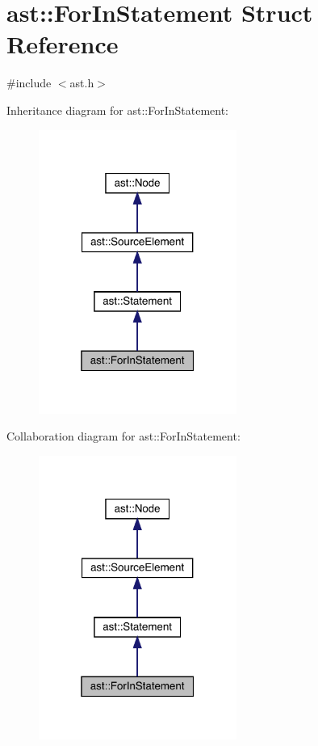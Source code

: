 \hypertarget{structast_1_1_for_in_statement}{}\section{ast\+:\+:For\+In\+Statement Struct Reference}
\label{structast_1_1_for_in_statement}


{\ttfamily \#include $<$ast.\+h$>$}



Inheritance diagram for ast\+:\+:For\+In\+Statement\+:
\nopagebreak
\begin{figure}[H]
\begin{center}
\leavevmode
\includegraphics[width=184pt]{structast_1_1_for_in_statement__inherit__graph}
\end{center}
\end{figure}


Collaboration diagram for ast\+:\+:For\+In\+Statement\+:
\nopagebreak
\begin{figure}[H]
\begin{center}
\leavevmode
\includegraphics[width=184pt]{structast_1_1_for_in_statement__coll__graph}
\end{center}
\end{figure}
